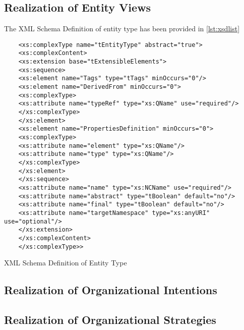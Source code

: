 \subsection{Realization of Entity Views}
\label{subsec:realofentityviews}
The XML Schema Definition of entity type has been provided in \ref{lst:xsdlist}



\begin{Listing}
	\begin{lstlisting}
	<xs:complexType name="tEntityType" abstract="true">
	<xs:complexContent>
	<xs:extension base="tExtensibleElements">
	<xs:sequence>
	<xs:element name="Tags" type="tTags" minOccurs="0"/>
	<xs:element name="DerivedFrom" minOccurs="0">
	<xs:complexType>
	<xs:attribute name="typeRef" type="xs:QName" use="required"/>
	</xs:complexType>
	</xs:element>
	<xs:element name="PropertiesDefinition" minOccurs="0">
	<xs:complexType>
	<xs:attribute name="element" type="xs:QName"/>
	<xs:attribute name="type" type="xs:QName"/>
	</xs:complexType>
	</xs:element>
	</xs:sequence>
	<xs:attribute name="name" type="xs:NCName" use="required"/>
	<xs:attribute name="abstract" type="tBoolean" default="no"/>
	<xs:attribute name="final" type="tBoolean" default="no"/>
	<xs:attribute name="targetNamespace" type="xs:anyURI" use="optional"/>
	</xs:extension>
	</xs:complexContent>
	</xs:complexType>>
	\end{lstlisting}
	\caption{XML Schema Definition of Entity Type}
	\label{lst:xsdlist}
\end{Listing}

\subsection{Realization of Organizational Intentions}


\subsection{Realization of Organizational  Strategies}

